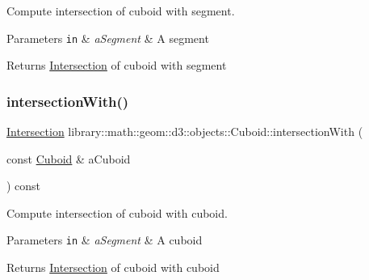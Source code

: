 Compute intersection of cuboid with segment. 


\begin{DoxyParams}[1]{Parameters}
\mbox{\tt in}  & {\em a\+Segment} & A segment \\
\hline
\end{DoxyParams}
\begin{DoxyReturn}{Returns}
\hyperlink{classlibrary_1_1math_1_1geom_1_1d3_1_1_intersection}{Intersection} of cuboid with segment 
\end{DoxyReturn}
\mbox{\label{classlibrary_1_1math_1_1geom_1_1d3_1_1objects_1_1_cuboid_a39cb1353c26cf80e35abbda242ac2578}} 
\subsubsection{\texorpdfstring{intersection\+With()}{intersectionWith()}\hspace{0.1cm}{\footnotesize\ttfamily [4/5]}}
{\footnotesize\ttfamily \hyperlink{classlibrary_1_1math_1_1geom_1_1d3_1_1_intersection}{Intersection} library\+::math\+::geom\+::d3\+::objects\+::\+Cuboid\+::intersection\+With (\begin{DoxyParamCaption}\item[{const \hyperlink{classlibrary_1_1math_1_1geom_1_1d3_1_1objects_1_1_cuboid}{Cuboid} \&}]{a\+Cuboid }\end{DoxyParamCaption}) const}



Compute intersection of cuboid with cuboid. 


\begin{DoxyParams}[1]{Parameters}
\mbox{\tt in}  & {\em a\+Segment} & A cuboid \\
\hline
\end{DoxyParams}
\begin{DoxyReturn}{Returns}
\hyperlink{classlibrary_1_1math_1_1geom_1_1d3_1_1_intersection}{Intersection} of cuboid with cuboid 
\end{DoxyReturn}
\mbox{\label{classlibrary_1_1math_1_1geom_1_1d3_1_1objects_1_1_cuboid_a127353762abd63e350dd290fd8c10e88}} 
